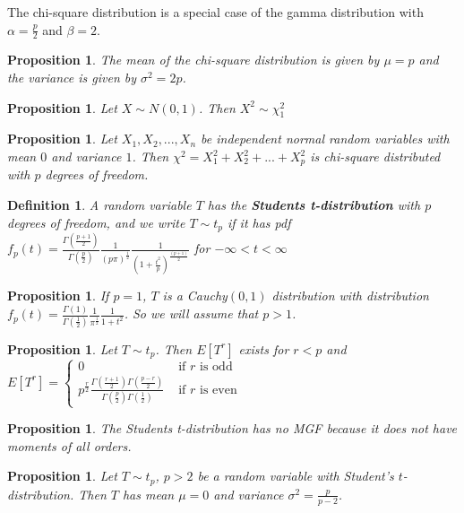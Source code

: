 \documentclass[12pt,twoside]{report}
\theoremstyle{thmstyle}
\newtheorem{defn}{Definition}
\newtheorem{prop}[subsection]{Proposition}
\begin{document}
The chi-square distribution is a special case of the gamma distribution with $\alpha = \frac{p}{2}$ and $\beta = 2$.

\begin{prop}
The mean of the chi-square distribution is given by $\mu = p$ and the variance is given by $\sigma^2 = 2p$.
\end{prop}

\begin{prop}
Let $X \sim N(0,1)$. Then $X^2 \sim \chi_1^2$
\end{prop}

\begin{prop}
    Let $X_1, X_2, ..., X_n$ be independent normal random variables with mean $0$ and variance $1$. Then $\chi^2 = X_1^2 + X_2^2 + ... + X_p^2$ is chi-square distributed with $p$ degrees of freedom.
\end{prop}

\begin{defn}
    A random variable $T$ has the \textbf{Students t-distribution} with $p$ degrees of freedom, and we write $T \sim t_p$ if it has pdf $f_p (t) = \displaystyle \frac{\Gamma(\frac{p+1}{2})}{\Gamma(\frac{p}{2})} \frac{1}{(p \pi)^{\frac{1}{2}}} \frac{1}{(1 + \frac{t^2}{p})^{\frac{(p+1)}{2}}} $ for $- \infty < t < \infty$
\end{defn}

\begin{prop}
    If $p=1$, $T$ is a Cauchy$(0,1)$ distribution with distribution $f_p(t) = \displaystyle\frac{\Gamma(1)}{\Gamma(\frac{1}{2})} \frac{1}{\pi^\frac{1}{2}} \frac{1}{1+t^2}$. So we will assume that $p > 1$.
\end{prop}

\begin{prop}
    Let $T \sim t_p$. Then $E[T^r]$ exists for $r < p$ and \\ $E[T^r] = \begin{cases} 0 & \text{ if } r \text{ is odd } \\   \displaystyle p^{\frac{r}{2}} \frac{\Gamma(\frac{r+1}{2})\Gamma(\frac{p-r}{2})}{\Gamma(\frac{p}{2})\Gamma(\frac{1}{2})} & \text{ if } r \text{ is even }\end{cases}$
\end{prop}

\begin{prop}
    The Students t-distribution has no MGF because it does not have moments of all orders.
\end{prop}

\begin{prop}
    Let $T \sim t_p$, $p > 2$ be a random variable with Student's $t$-distribution. Then $T$ has mean $\mu = 0$ and variance $\sigma^2 = \displaystyle \frac{p}{p-2}$.
\end{prop}
\end{document}
